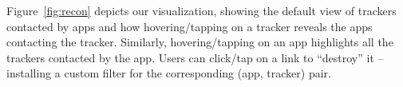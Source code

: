 Figure~\ref{fig:recon} depicts our visualization, showing the default view of trackers contacted by apps and how 
hovering/tapping on a tracker reveals the apps contacting the tracker. Similarly, hovering/tapping on an app 
highlights all the trackers contacted by the app. Users can click/tap on a link to ``destroy'' it -- installing a custom 
filter for the corresponding (app, tracker) pair. 









